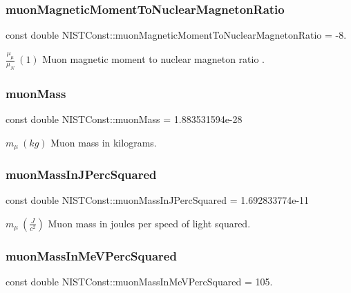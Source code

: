 \subsubsection{\texorpdfstring{muon\+Magnetic\+Moment\+To\+Nuclear\+Magneton\+Ratio}{muonMagneticMomentToNuclearMagnetonRatio}}
{\footnotesize\ttfamily const double N\+I\+S\+T\+Const\+::muon\+Magnetic\+Moment\+To\+Nuclear\+Magneton\+Ratio = -\/8.}

$\frac{\mu_\mu}{\mu_N} \ (1)$ Muon magnetic moment to nuclear magneton ratio . \mbox{\label{group___n_i_s_t_const-_muon_ga4fed15b8e94009be07c0a5f17af9ffb8}} 
\subsubsection{\texorpdfstring{muon\+Mass}{muonMass}}
{\footnotesize\ttfamily const double N\+I\+S\+T\+Const\+::muon\+Mass = 1.\+883531594e-\/28}

$m_\mu \ (kg)$ Muon mass in kilograms. \mbox{\label{group___n_i_s_t_const-_muon_ga98b4dada2be08e51ae363d18d745d60e}} 
\subsubsection{\texorpdfstring{muon\+Mass\+In\+J\+Perc\+Squared}{muonMassInJPercSquared}}
{\footnotesize\ttfamily const double N\+I\+S\+T\+Const\+::muon\+Mass\+In\+J\+Perc\+Squared = 1.\+692833774e-\/11}

$m_\mu \ (\frac{J}{c^2})$ Muon mass in joules per speed of light squared. \mbox{\label{group___n_i_s_t_const-_muon_ga781e348a83468d065630fd1b6da85eab}} 
\subsubsection{\texorpdfstring{muon\+Mass\+In\+Me\+V\+Perc\+Squared}{muonMassInMeVPercSquared}}
{\footnotesize\ttfamily const double N\+I\+S\+T\+Const\+::muon\+Mass\+In\+Me\+V\+Perc\+Squared = 105.}

